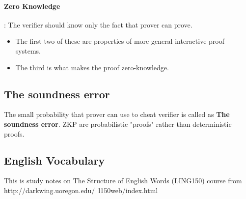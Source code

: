 \documentclass[12pt]{article}
\begin{document}
\paragraph{Zero Knowledge} : The verifier should know only the fact that prover can prove. 

\begin{itemize}
\item The first two of these are properties of more general interactive proof systems. 
\item The third is what makes the proof zero-knowledge.
\end{itemize}

\subsection{The soundness error}
The small probability that prover can use to cheat verifier is called as \textbf{The soundness error}.
ZKP are probabilistic "proofs" rather than deterministic proofs.









\pagebreak
\vspace*{\fill}
\begin{center}
\section{English Vocabulary}
\end{center}
\vspace*{\fill}
\pagebreak

This is study notes on The Structure of English Words (LING150) course from http://darkwing.uoregon.edu/~l150web/index.html
\end{document}
